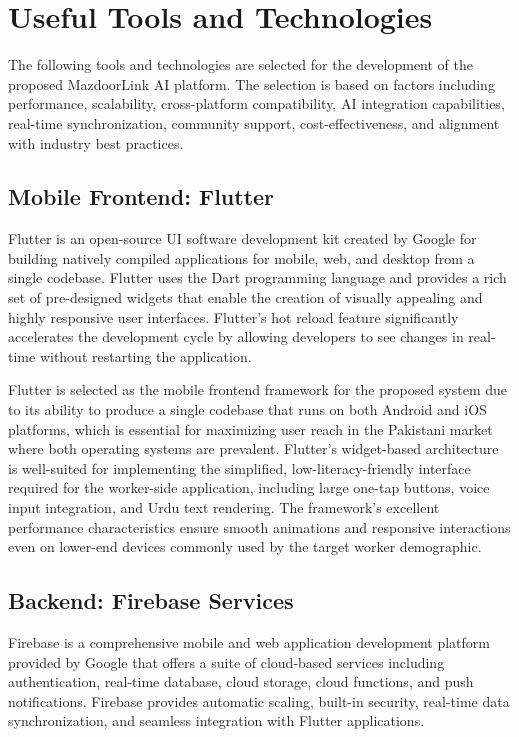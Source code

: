 \documentclass[12pt,a4paper]{report}
\begin{document}
\section{Useful Tools and Technologies}

The following tools and technologies are selected for the development of the
proposed MazdoorLink AI platform. The selection is based on factors including
performance, scalability, cross-platform compatibility, AI integration
capabilities, real-time synchronization, community support, cost-effectiveness,
and alignment with industry best practices.

\subsection{Mobile Frontend: Flutter}
Flutter is an open-source UI software development kit created by Google for
building natively compiled applications for mobile, web, and desktop from a
single codebase. Flutter uses the Dart programming language and provides a rich
set of pre-designed widgets that enable the creation of visually appealing and
highly responsive user interfaces. Flutter's hot reload feature significantly
accelerates the development cycle by allowing developers to see changes in
real-time without restarting the application.

Flutter is selected as the mobile frontend framework for the proposed system due
to its ability to produce a single codebase that runs on both Android and iOS
platforms, which is essential for maximizing user reach in the Pakistani market
where both operating systems are prevalent. Flutter's widget-based architecture
is well-suited for implementing the simplified, low-literacy-friendly interface
required for the worker-side application, including large one-tap buttons, voice
input integration, and Urdu text rendering. The framework's excellent performance
characteristics ensure smooth animations and responsive interactions even on
lower-end devices commonly used by the target worker demographic.

\subsection{Backend: Firebase Services}
Firebase is a comprehensive mobile and web application development platform
provided by Google that offers a suite of cloud-based services including
authentication, real-time database, cloud storage, cloud functions, and push
notifications. Firebase provides automatic scaling, built-in security, real-time
data synchronization, and seamless integration with Flutter applications.
\end{document}
